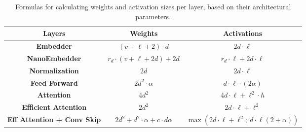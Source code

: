 \begin{table*}[t]
    \caption{Formulas for calculating weights and activation sizes per layer, based on their architectural parameters.}
    \begin{center}
        \begin{tabular}{|c | c c|}
        \hline
        \textbf{Layers} & \textbf{Weights} & \textbf{Activations} \\
        \hline \hline
        \textbf{Embedder}               & $(v + \ell +2)\cdot d$ 
                                        & $2 d\cdot \ell$ \\
        \textbf{NanoEmbedder}           & \(r_d \cdot (v + \ell + 2 d ) + 2 d\)
                                        & \(r_d \cdot \ell + 2 d \cdot \ell\) \\
        \textbf{Normalization}          & \(2 d\)
                                        & \(2 d \cdot \ell\) \\
        \textbf{Feed Forward}           & \(2 d^2 \cdot \alpha \) 
                                        & \(d \cdot \ell \cdot ( 2 \alpha )\)\\
        \textbf{Attention}              & \(4 d^2 \)
                                        & \(4 d \cdot \ell + \ell^2 \cdot h\)\\
        \textbf{Efficient Attention}    & \(2 d^2 \) 
                                        & \(2 d \cdot \ell + \ell^2 \)\\
        \textbf{Eff Attention + Conv Skip} & \(2 d^2 + d^2 \cdot \alpha + c \cdot d \alpha\)
                                        & \(\max ( 2 d \cdot \ell + \ell^2 ; \  d \cdot \ell (2 + \alpha )) \)\\
        \hline
        \end{tabular}
    \end{center}
    \label{table:w&a_noMAMBA_full}
\end{table*}